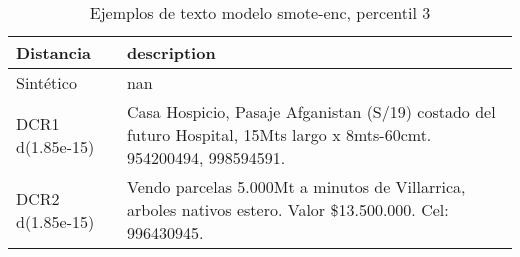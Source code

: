 \begin{table}[H]
\centering
\fontsize{10}{14}\selectfont
\caption{Ejemplos de texto modelo smote-enc, percentil 3}
\label{table-example-economicos-b-1-smote-enc-3p-text}
\begin{tabular}{|l|m{35em}|}
\hline
\rowcolor[gray]{0.8}
Distancia & description \\
\hline Sintético & nan \\
\hline DCR1 d(1.85e-15) & Casa Hospicio, Pasaje Afganistan (S/19) costado del futuro Hospital, 15Mts largo x 8mts-60cmt. 954200494, 998594591. \\
\hline DCR2 d(1.85e-15) & Vendo parcelas 5.000Mt a minutos de Villarrica, arboles nativos estero. Valor \$13.500.000. Cel: 996430945. \\
\hline
\end{tabular}
\end{table}
